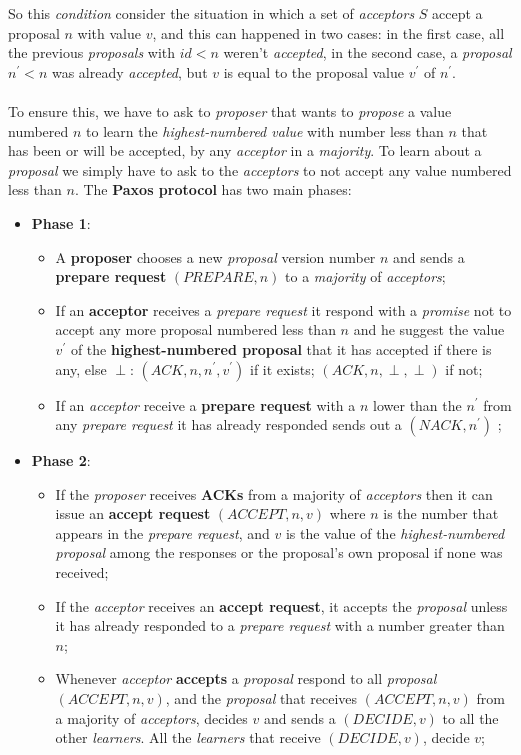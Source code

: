 \documentclass{article}
\begin{document}
So this \emph{condition} consider the situation in which a set of \emph{acceptors} $S$ accept a proposal $n$ with value $v$, and this can happened in two cases: in the first case, all the previous \emph{proposals} with $id<n$ weren't \emph{accepted}, in the second case, a \emph{proposal} $n^{'}<n$ was already \emph{accepted}, but $v$ is equal to the proposal value $v^{'}$ of $n^{'}$. \\\\
To ensure this, we have to ask to \emph{proposer} that wants to \emph{propose} a value numbered $n$ to learn the \emph{highest-numbered value} with number less than $n$ that has been or will be accepted, by any \emph{acceptor} in a \emph{majority}. To learn about a \emph{proposal} we simply have to ask to the \emph{acceptors} to not accept any value numbered less than $n$. The \textbf{Paxos protocol} has two main phases:
\begin{itemize}
\item \textbf{Phase 1}:  
\begin{itemize}
\item A \textbf{proposer} chooses a new \emph{proposal} version number $n$ and sends a \textbf{prepare request} $(PREPARE,n)$ to a \emph{majority} of \emph{acceptors};
\item If an \textbf{acceptor} receives a \emph{prepare request} it respond with a \emph{promise} not to accept any more proposal numbered less than $n$ and he suggest the value $v^{'}$ of the \textbf{highest-numbered proposal} that it has accepted if there is any, else $\perp$:
\subitem $(ACK, n, n^{'}, v^{'})$ if it exists;
\subitem  $(ACK, n, \perp, \perp)$ if not;
\item If an \emph{acceptor} receive a \textbf{prepare request} with a $n$ lower than the $n^{'}$ from any \emph{prepare request} it has already responded sends out a $(NACK, n^{'})$ ;
\end{itemize}
\item \textbf{Phase 2}:
\begin{itemize}
\item If the \emph{proposer} receives \textbf{ACKs} from a majority of \emph{acceptors} then it can issue an \textbf{accept request} $(ACCEPT,n,v)$ where $n$ is the number that appears in the \emph{prepare request}, and $v$ is the value of the \emph{highest-numbered proposal} among the responses or the proposal's own proposal if none was received;
\item If the \emph{acceptor} receives an \textbf{accept request}, it accepts the \emph{proposal} unless it has already responded to a \emph{prepare request} with a number greater than $n$;
\item Whenever \emph{acceptor} \textbf{accepts} a \emph{proposal} respond to all \emph{proposal} $(ACCEPT,n,v)$, and the \emph{proposal} that receives $(ACCEPT,n,v)$ from a majority of \emph{acceptors}, decides $v$ and sends a $(DECIDE,v)$ to all the other \emph{learners}. All the \emph{learners} that receive $(DECIDE,v)$, decide $v$;
\end{itemize}
\end{itemize}
\end{document}
